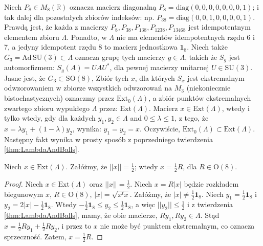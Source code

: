 {Niech $P_{8} \in M_{8}(\mathbb{R})$ oznacza macierz diagonalną
$P_{8} = \text{diag}(0,0,0,0,0,0,0,1)$;
i tak dalej dla pozostałych zbiorów indeksów: np.
$P_{38} = \text{diag}(0,0,1,0,0,0,0,1)$.
Prawdą jest, że każda z macierzy
$P_{8}, P_{38}, P_{138}, P_{1238}, P_{13468}$ jest idempotentnym elementem
zbioru $\Lambda$.
Ponadto, w $\Lambda$ nie ma elementów idempotentnych rzędu 6 i 7,
a jedyny idempotent rzędu 8 to macierz jednostkowa $\mathbf{1}_{8}$.
Niech także $G_{3} = \text{Ad} \, \text{SU}(3) \subset \Lambda$ oznacza
grupę tych macierzy $g \in \Lambda$, takich że
$S_{g}$ jest automorfizmem: $S_{g}(A) = U A U^{*}$,
dla pewnej macierzy unitarnej $U \in \text{SU}(3)$.
Jasne jest, że $G_{3} \subset \text{SO}(8)$,
Zbiór tych $x$, dla których $S_{x}$ jest ekstremalnym
odwzorowaniem w zbiorze wszystkich odwzorowań na $M_{3}$
(niekoniecznie bistochastycznych) oznaczmy przez
$\text{Ext}_{0}(\Lambda)$,
a zbiór punktów ekstremalnych zwartego zbioru wypukłego
$\Lambda$ przez: $\text{Ext}(\Lambda)$.
Macierz $x \in \text{Ext}(\Lambda)$,
wtedy i tylko wtedy, gdy dla każdych
$y_{1}, y_{2} \in \Lambda$ and $0 \leq \lambda \leq 1$,
z tego, że $x = \lambda y_{1} + (1-\lambda) y_{2}$,
wynika: $y_{1} = y_{2} = x$.
Oczywiście, $\text{Ext}_{0}(\Lambda) \subset \text{Ext}(\Lambda)$.
Następny fakt wynika w prosty sposób z poprzedniego twierdzenia
\ref{thm:LambdaAndBalls}.

\begin{Theorem}
    \label{thm:oneHalfofOrthogonal}
    Niech $x \in \mathrm{Ext}(\Lambda)$.
Załóżmy, że $||x|| = \frac{1}{2}$;
wtedy $ x = \frac{1}{2} R$, dla $R \in \mathrm{O}(8)$.
\end{Theorem}
\begin{proof}
Niech $x \in \mathrm{Ext}(\Lambda)$ oraz $||x|| = \frac{1}{2}$.
Niech $x = R |x|$ będzie rozkładem biegunowym $x$,
    $R \in \text{O}(8)$, $|x| = \sqrt{x^{t} x}$.
Załóżmy, że $|x| \neq \frac{1}{2} \mathbf{1}_{8}$.
Niech $y_{1} = \frac{1}{2} \mathbf{1}_{8}$ i
    $y_{2} = 2 |x| - \frac{1}{2} \mathbf{1}_{8}$.
Wtedy $- \frac{1}{2} \mathbf{1}_{8} \leq y_{2} \leq \frac{1}{2} \mathbf{1}_{8}$,
a więc $|| y_{2} || \leq \frac{1}{2}$
i z twierdzenia \ref{thm:LambdaAndBalls},
mamy, że obie macierze, $R y_{1}, R y_{2} \in \Lambda$.
Stąd $x = \frac{1}{2} R y_{1} + \frac{1}{2} R y_{2}$,
i przez to $x$ nie może być punktem ekstremalnym, co oznacza sprzeczność.
Zatem, $x = \frac{1}{2} R$.
\end{proof}


}
